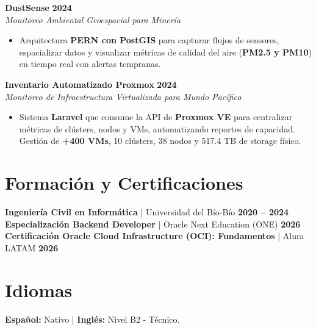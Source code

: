\documentclass[a4paper,10pt]{article}
\begin{document}
\vspace{0.2cm}

\noindent \textbf{DustSense} \hfill \textbf{2024} \\
\textit{Monitoreo Ambiental Geoespacial para Minería} 
\begin{itemize}[leftmargin=*, noitemsep]
    \item Arquitectura \textbf{PERN con PostGIS} para capturar flujos de sensores, espacializar datos y visualizar métricas de calidad del aire (\textbf{PM2.5 y PM10}) en tiempo real con alertas tempranas.
\end{itemize}

\vspace{0.2cm}

\noindent \textbf{Inventario Automatizado Proxmox} \hfill \textbf{2024} \\
\textit{Monitoreo de Infraestructura Virtualizada para Mundo Pacífico}
\begin{itemize}[leftmargin=*, noitemsep]
    \item Sistema \textbf{Laravel} que consume la API de \textbf{Proxmox VE} para centralizar métricas de clústers, nodos y VMs, automatizando reportes de capacidad. Gestión de \textbf{+400 VMs}, 10 clústers, 38 nodos y 517.4 TB de storage físico.
\end{itemize}

\section{Formación y Certificaciones}
\noindent \textbf{Ingeniería Civil en Informática} | Universidad del Bío-Bío \hfill \textbf{2020 -- 2024} \\
\noindent \textbf{Especialización Backend Developer} | Oracle Next Education (ONE) \hfill \textbf{2026} \\
\noindent \textbf{Certificación Oracle Cloud Infrastructure (OCI): Fundamentos} | Alura LATAM \hfill \textbf{2026} 

\vspace{0.2cm}

\section{Idiomas}
\textbf{Español:} Nativo \quad | \quad \textbf{Inglés:} Nivel B2 - Técnico.
\end{document}
